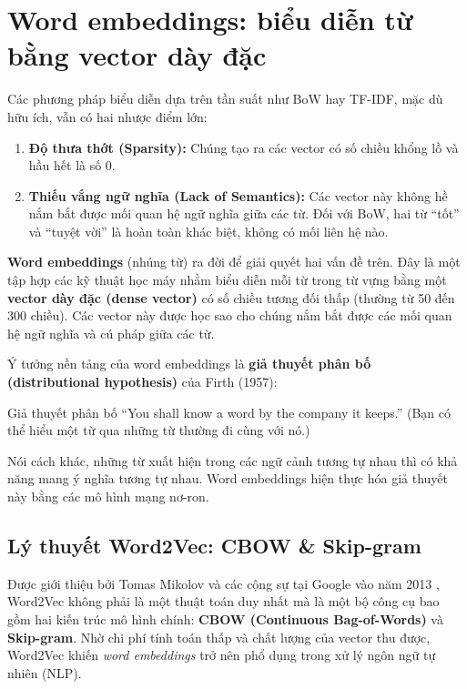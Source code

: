 
\section{Word embeddings: biểu diễn từ bằng vector dày đặc}
\label{sec:word_embeddings}

Các phương pháp biểu diễn dựa trên tần suất như BoW hay TF-IDF, mặc dù hữu ích, vẫn có hai nhược điểm lớn:
\begin{enumerate}
    \item \textbf{Độ thưa thớt (Sparsity):} Chúng tạo ra các vector có số chiều khổng lồ và hầu hết là số 0.
    \item \textbf{Thiếu vắng ngữ nghĩa (Lack of Semantics):} Các vector này không hề nắm bắt được mối quan hệ ngữ nghĩa giữa các từ. Đối với BoW, hai từ “tốt” và “tuyệt vời” là hoàn toàn khác biệt, không có mối liên hệ nào.
\end{enumerate}

\textbf{Word embeddings} (nhúng từ) ra đời để giải quyết hai vấn đề trên. Đây là một tập hợp các kỹ thuật học máy nhằm biểu diễn mỗi từ trong từ vựng bằng một \textbf{vector dày đặc (dense vector)} có số chiều tương đối thấp (thường từ 50 đến 300 chiều). Các vector này được học sao cho chúng nắm bắt được các mối quan hệ ngữ nghĩa và cú pháp giữa các từ.

Ý tưởng nền tảng của word embeddings là \textbf{giả thuyết phân bố (distributional hypothesis)} của Firth (1957):
\begin{keyidea}{Giả thuyết phân bố}
“You shall know a word by the company it keeps.” (Bạn có thể hiểu một từ qua những từ thường đi cùng với nó.)
\end{keyidea}
Nói cách khác, những từ xuất hiện trong các ngữ cảnh tương tự nhau thì có khả năng mang ý nghĩa tương tự nhau. Word embeddings hiện thực hóa giả thuyết này bằng các mô hình mạng nơ-ron.

\subsection{Lý thuyết Word2Vec: CBOW \& Skip-gram}
\label{ssec:word2vec}
Được giới thiệu bởi Tomas Mikolov và các cộng sự tại Google vào năm 2013 \cite{mikolov2013efficient, mikolov2013distributed}, Word2Vec không phải là một thuật toán duy nhất mà là một bộ công cụ bao gồm hai kiến trúc mô hình chính: \textbf{CBOW (Continuous Bag-of-Words)} và \textbf{Skip-gram}. Nhờ chi phí tính toán thấp và chất lượng của vector thu được, Word2Vec khiến \textit{word embeddings} trở nên phổ dụng trong xử lý ngôn ngữ tự nhiên (NLP).

